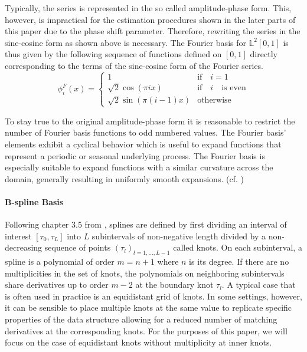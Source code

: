 \documentclass[11pt,twoside,a4paper]{article}
\begin{document}
	Typically, the series is represented in the so called amplitude-phase form. This, however, is impractical for the estimation procedures shown in the later parts of this paper due to the phase shift parameter. Therefore, rewriting the series in the sine-cosine form as shown above is necessary.	
	The Fourier basis for $\mathbb{L}^2[0,1]$ is thus given by the following sequence of functions defined on $[0,1]$ directly corresponding to the terms of the sine-cosine form of the Fourier series.
	\begin{equation}
		\phi_{i}^{F}(x) = 
		\begin{cases}
			1 & \text{if} \quad i = 1\\
			\sqrt{2} \cos(\pi i x) & \text{if} \quad i \quad \text{is even} \\
			\sqrt{2} \sin(\pi (i-1)x) & \text{otherwise}
		\end{cases}
	\end{equation}

	To stay true to the original amplitude-phase form it is reasonable to restrict the number of Fourier basis functions to odd numbered values. The Fourier basis' elements exhibit a cyclical behavior which is useful to expand functions that represent a periodic or seasonal underlying process. The Fourier basis is especially suitable to expand functions with a similar curvature across the domain, generally resulting in uniformly smooth expansions. (cf. \cite{ramsay_functional_2005})
	\vspace{-0.2cm}

	\paragraph{B-spline Basis} Following chapter 3.5 from \cite{ramsay_functional_2005}, splines are defined by first dividing an interval of interest $[\tau_0, \tau_L]$ into $L$ subintervals of non-negative length divided by a non-decreasing sequence of points $(\tau_l)_{l = 1,\dots, L-1}$ called knots. On each subinterval, a spline is a polynomial of order $m = n+1$ where $n$ is its degree. If there are no multiplicities in the set of knots, the polynomials on neighboring subintervals share derivatives up to order $m-2$ at the boundary knot $\tau_l$. A typical case that is often used in practice is an equidistant grid of knots. In some settings, however, it can be sensible to place multiple knots at the same value to replicate specific properties of the data structure allowing for a reduced number of matching derivatives at the corresponding knots. For the purposes of this paper, we will focus on the case of equidistant knots without multiplicity at inner knots.\\
	
\end{document}

